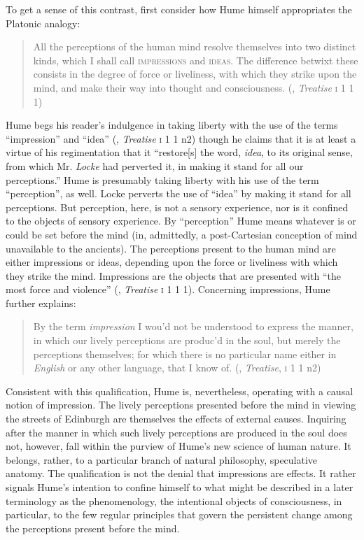 To get a sense of this contrast, first consider how Hume himself appropriates the Platonic analogy:
\begin{quote}
	All the perceptions of the human mind resolve themselves into two distinct kinds, which I shall call \textsc{impressions} and \textsc{ideas}. The difference betwixt these consists in the degree of force or liveliness, with which they strike upon the mind, and make their way into thought and consciousness. (\citealt{Hume:1739kx}, \emph{Treatise} \textsc{i} 1 1 1)
\end{quote}
Hume begs his reader's indulgence in taking liberty with the use of the terms ``impression'' and ``idea'' (\citealt{Hume:1739kx}, \emph{Treatise} \textsc{i} 1 1 n2) though he claims that it is at least a virtue of his regimentation that it ``restore[s] the word, \emph{idea}, to its original sense, from which Mr. \emph{Locke} had perverted it, in making it stand for all our perceptions.'' Hume is presumably taking liberty with his use of the term ``perception'', as well. Locke perverts the use of ``idea'' by making it stand for all perceptions. But perception, here, is not a sensory experience, nor is it confined to the objects of sensory experience. By ``perception'' Hume means whatever is or could be set before the mind (in, admittedly, a post-Cartesian conception of mind unavailable to the ancients). The perceptions present to the human mind are either impressions or ideas, depending upon the force or liveliness with which they strike the mind. Impressions are the objects that are presented with ``the most force and violence'' (\citealt{Hume:1739kx}, \emph{Treatise} \textsc{i} 1 1 1).  Concerning impressions, Hume further explains:
\begin{quote}
	By the term \emph{impression} I wou'd not be understood to express the manner, in which our lively perceptions are produc'd in the soul, but merely the perceptions themselves; for which there is no particular name either in \emph{English} or any other language, that I know of. (\citealt{Hume:1739kx}, \emph{Treatise}, \textsc{i} 1 1 n2)
\end{quote}
Consistent with this qualification, Hume is, nevertheless, operating with a causal notion of impression. The lively perceptions presented before the mind in viewing the streets of Edinburgh are themselves the effects of external causes. Inquiring after the manner in which such lively perceptions are produced in the soul does not, however, fall within the purview of Hume's new science of human nature. It belongs, rather, to a particular branch of natural philosophy, speculative anatomy. The qualification is not the denial that impressions are effects. It rather signals Hume's intention to confine himself to what might be described in a later terminology as the phenomenology, the intentional objects of consciousness, in particular, to the few regular principles that govern the persistent change among the perceptions present before the mind.

